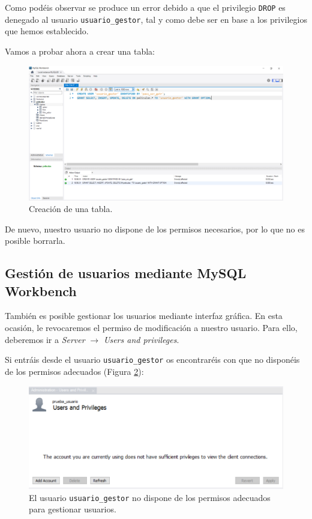 \documentclass{db-practice}
\begin{document}
Como podéis observar se produce un error debido a que el privilegio \texttt{DROP} es denegado al usuario \texttt{usuario\_gestor}, tal y como debe ser en base a los privilegios que hemos establecido.

Vamos a probar ahora a crear una tabla:


\begin{figure}[H]
    \centering
    \includegraphics[width=\textwidth]{figs/gestion-usuarios/creacion_usr.PNG}
    \caption{Creación de una tabla.}
    \label{fig:crear}
\end{figure}

De nuevo, nuestro usuario no dispone de los permisos necesarios, por lo que no es posible borrarla.

\subsection*{Gestión de usuarios mediante MySQL Workbench}

También es posible gestionar los usuarios mediante interfaz gráfica. En esta ocasión, le revocaremos el permiso de modificación a nuestro usuario. Para ello, deberemos ir a \textit{Server} $\rightarrow$ \textit{Users and privileges}.

Si entráis desde el usuario \texttt{usuario\_gestor} os encontraréis con que no disponéis de los permisos adecuados (Figura \ref{fig:gestor-usuario}):

\begin{figure}[H]
    \centering
    \includegraphics[width=1\linewidth]{figs/gestion-usuarios/gestion-no-permisos.png}
    \caption{El usuario \texttt{usuario\_gestor} no dispone de los permisos adecuados para gestionar usuarios.}
    \label{fig:gestor-usuario}
\end{figure}
\end{document}
